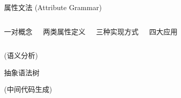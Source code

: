 
\begin{frame}{}
  \begin{center}
    属性文法 (Attribute Grammar)
  \end{center}
\end{frame}

\begin{frame}{}
  \begin{center}
    \begin{columns}[b]
        \vspace{-0.10cm}
        \begin{center}
          一对概念
        \end{center}
        \vspace{-0.60cm}
        \begin{center}
          两类属性定义
        \end{center}
        \begin{center}
          三种实现方式
        \end{center}
        \begin{center}
          四大应用
        \end{center}
    \end{columns}
  \end{center}
\end{frame}

\begin{frame}{}
  \begin{center}


    \vspace{0.30cm}
     (语义分析)

    \vspace{0.30cm}
    抽象语法树

    \vspace{0.30cm}
     (中间代码生成)
  \end{center}
\end{frame}

